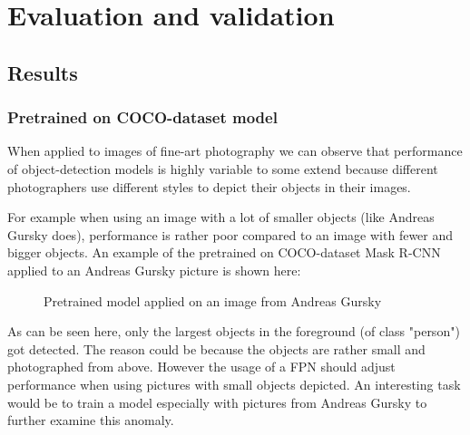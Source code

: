 \chapter{Evaluation and validation}
\label{ch:Eval}

\section{Results}

\subsection{Pretrained on COCO-dataset model}

When applied to images of fine-art photography we can observe that performance of object-detection models is highly variable to some extend because different photographers use different styles to depict their objects in their images.

For example when using an image with a lot of smaller objects (like Andreas Gursky does), performance is rather poor compared to an image with fewer and bigger objects. An example of the pretrained on COCO-dataset Mask R-CNN applied to an Andreas Gursky picture is shown here:

\begin{figure}[H]
	\caption{\label{fig:fpn} Pretrained model applied on an image from Andreas Gursky}
\end{figure}

As can be seen here, only the largest objects in the foreground (of class "person") got detected. The reason could be because the objects are rather small and photographed from above. However the usage of a FPN should adjust performance when using pictures with small objects depicted. An interesting task would be to train a model especially with pictures from Andreas Gursky to further examine this anomaly.
	
